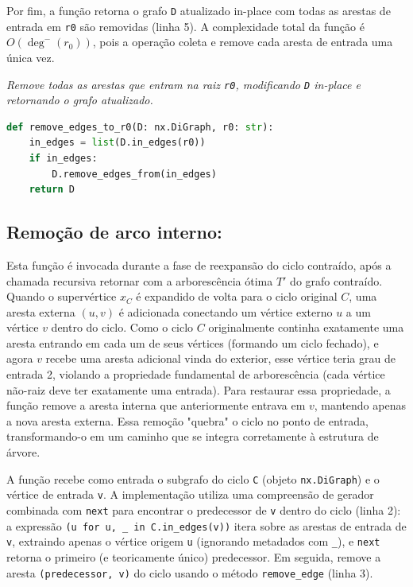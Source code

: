 Por fim, a função retorna o grafo \texttt{D} atualizado in-place com todas as arestas de entrada em \texttt{r0} são removidas (linha 5). A complexidade total da função é \(O(\deg^-(r_0))\), pois a operação coleta e remove cada aresta de entrada uma única vez.

\begin{tcolorbox}[
        enhanced, breakable,
        colframe=blue!60!black, colback=blue!2,
        colbacktitle=blue!15, coltitle=black,
        title={Remoção de arestas que entram na raiz},
        boxed title style={sharp corners, boxrule=0.6pt},
        sharp corners, boxrule=0.6pt
    ]
    \emph{Remove todas as arestas que entram na raiz \texttt{r0}, modificando \texttt{D} in-place e retornando o grafo atualizado.}
    \tcblower
    \begin{lstlisting}[mathescape=true, language=Python]
def remove_edges_to_r0(D: nx.DiGraph, r0: str):
    in_edges = list(D.in_edges(r0))
    if in_edges:
        D.remove_edges_from(in_edges)
    return D
\end{lstlisting}
\end{tcolorbox}


\subsection{Remoção de arco interno:}

Esta função é invocada durante a fase de reexpansão do ciclo contraído, após a chamada recursiva retornar com a arborescência ótima \(T'\) do grafo contraído. Quando o supervértice \(x_C\) é expandido de volta para o ciclo original \(C\), uma aresta externa \((u,v)\) é adicionada conectando um vértice externo \(u\) a um vértice \(v\) dentro do ciclo. Como o ciclo \(C\) originalmente continha exatamente uma aresta entrando em cada um de seus vértices (formando um ciclo fechado), e agora \(v\) recebe uma aresta adicional vinda do exterior, esse vértice teria grau de entrada 2, violando a propriedade fundamental de arborescência (cada vértice não-raiz deve ter exatamente uma entrada). Para restaurar essa propriedade, a função remove a aresta interna que anteriormente entrava em \(v\), mantendo apenas a nova aresta externa. Essa remoção "quebra" o ciclo no ponto de entrada, transformando-o em um caminho que se integra corretamente à estrutura de árvore.

A função recebe como entrada o subgrafo do ciclo \texttt{C} (objeto \texttt{nx.DiGraph}) e o vértice de entrada \texttt{v}. A implementação utiliza uma compreensão de gerador combinada com \texttt{next} para encontrar o predecessor de \texttt{v} dentro do ciclo (linha 2): a expressão \texttt{(u for u, \_ in C.in\_edges(v))} itera sobre as arestas de entrada de \texttt{v}, extraindo apenas o vértice origem \texttt{u} (ignorando metadados com \texttt{\_}), e \texttt{next} retorna o primeiro (e teoricamente único) predecessor. Em seguida, remove a aresta \texttt{(predecessor, v)} do ciclo usando o método \texttt{remove\_edge} (linha 3).

